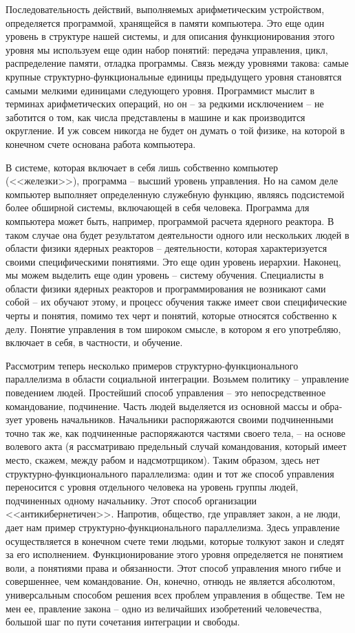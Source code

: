 \documentclass{book}
\begin{document}
Последовательность действий, выполняемых арифметическим устройством, определяется программой, хранящейся в памяти компьютера. Это еще один уровень в структуре нашей системы, и для описания функционирования этого уровня мы использу­ем еще один набор понятий: передача управления, цикл, распределение памяти, отладка программы. Связь между уровнями такова: самые крупные структурно-функциональные единицы предыдущего уровня становятся самыми мелкими единицами следующего уровня. Программист мыслит в терминах арифметических операций, но он -- за редкими исключением -- не заботится о том, как числа представлены в машине и как производится округление. И уж совсем никогда не будет он думать о той физике, на которой в конечном счете основана работа компьютера.

В системе, которая включает в себя лишь собственно компьютер (<<железки>>), программа -- высший уровень управления. Но на самом деле компьютер выполняет определенную служебную функцию, являясь подсистемой более обширной системы, включающей в себя человека. Программа для компьютера может быть, например, программой расчета ядерного реактора. В таком случае она будет результатом деятельности одного или нескольких людей в области физики ядерных реакторов -- деятельности, которая характеризуется своими спе­цифическими понятиями. Это еще один уровень иерархии. На­конец, мы можем выделить еще один уровень -- систему обу­чения. Специалисты в области физики ядерных реакторов и про­граммирования не возникают сами собой -- их обучают этому, и процесс обучения также имеет свои специфические черты и понятия, помимо тех черт и понятий, которые относятся собст­венно к делу. Понятие управления в том широком смысле, в котором я его употребляю, включает в себя, в частности, и обучение.

Рассмотрим теперь несколько примеров структурно-функ­ционального параллелизма в области социальной интеграции. Возьмем политику -- управление поведением людей. Простей­ший способ управления -- это непосредственное командование, подчинение. Часть людей выделяется из основной массы и обра­зует уровень начальников. Начальники распоряжаются своими подчиненными точно так же, как подчиненные распоряжаются частями своего тела, -- на основе волевого акта (я рассматри­ваю предельный случай командования, который имеет место, скажем, между рабом и надсмотрщиком). Таким образом, здесь нет структурно-функционального параллелизма: один и тот же способ управления переносится с уровня отдельного че­ловека на уровень группы людей, подчиненных одному началь­нику. Этот способ организации <<антикибернетичен>>. Напротив, общество, где управляет закон,  а не люди,  дает нам пример структурно-функционального параллелизма. Здесь управление осуществляется в конечном счете теми людьми, которые тол­куют закон и следят за его исполнением.
 Функционирование этого уровня определяется не понятием воли,  а понятиями права  и обязанности.  Этот способ управления много гибче и совер­шеннее, чем командование. Он, конечно, отнюдь не является абсолютом, универсальным способом решения всех проблем управления в обществе. Тем не мен ее, правление закона -- одно из величайших изобретений человечества, большой шаг по пу­ти сочетания интеграции и свободы.
\end{document}
